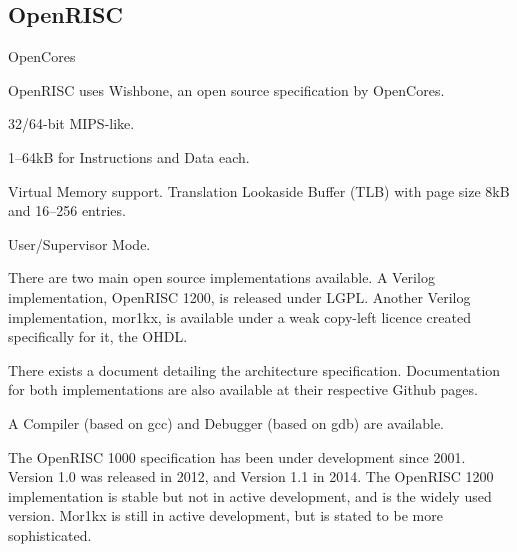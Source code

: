 \subsection{OpenRISC}
\begin{description}[style=nextline]
\item[Developer] OpenCores
\item[Bus Used] OpenRISC uses Wishbone, an open source specification by OpenCores.
\item[Architecture] 32/64-bit MIPS-like.
\item[Cache] 1--64kB for Instructions and Data each.
\item[MMU] Virtual Memory support. Translation Lookaside Buffer (TLB) with page size 8kB and 16--256 entries.
\item[User Levels] User/Supervisor Mode.
\item[License] There are two main open source implementations available. A Verilog implementation, OpenRISC 1200, is released under LGPL. Another Verilog implementation, mor1kx, is available under a weak copy-left licence created specifically for it, the OHDL.
\item[Documentation] There exists a document detailing the architecture specification.\cite{or1k} Documentation for both implementations are also available at their respective Github pages.\cite{or1200}\cite{mor1kx}
\item[Toolchain] A Compiler (based on gcc) and Debugger (based on gdb) are available.\cite{or1k-elf-gcc}
\item[Maturity] The OpenRISC 1000 specification has been under development since 2001. Version 1.0 was released in 2012, and Version 1.1 in 2014. The OpenRISC 1200 implementation is stable but not in active development, and is the widely used version.\cite{openrisc} Mor1kx is still in active development, but is stated to be more sophisticated.
\end{description}


